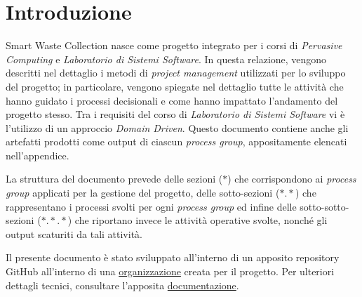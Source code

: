 \section*{Introduzione}
\label{sec:introduction}

Smart Waste Collection nasce come progetto integrato per i corsi di \textit{Pervasive Computing} e \textit{Laboratorio di Sistemi Software}.
In questa relazione, vengono descritti nel dettaglio i metodi di \textit{project management} utilizzati per lo sviluppo del progetto; in particolare, vengono spiegate nel dettaglio tutte le attività che hanno guidato i processi decisionali e come hanno impattato l'andamento del progetto stesso.
Tra i requisiti del corso di \textit{Laboratorio di Sistemi Software} vi è l'utilizzo di un approccio \textit{Domain Driven}. Questo documento contiene anche gli artefatti prodotti come output di ciascun \textit{process group}, appositamente elencati nell'appendice.

La struttura del documento prevede delle sezioni ($*$) che corrispondono ai \textit{process group} applicati per la gestione del progetto, delle sotto-sezioni ($*.*$) che rappresentano i processi svolti per ogni \textit{process group} ed infine delle sotto-sotto-sezioni ($*.*.*$) che riportano invece le attività operative svolte, nonché gli output scaturiti da tali attività.

Il presente documento è stato sviluppato all'interno di un apposito repository GitHub all'interno di una \href{https://github.com/SmartWasteCollection}{organizzazione} creata per il progetto. Per ulteriori dettagli tecnici, consultare l'apposita \href{https://smartwastecollection.github.io/documentation/}{documentazione}.